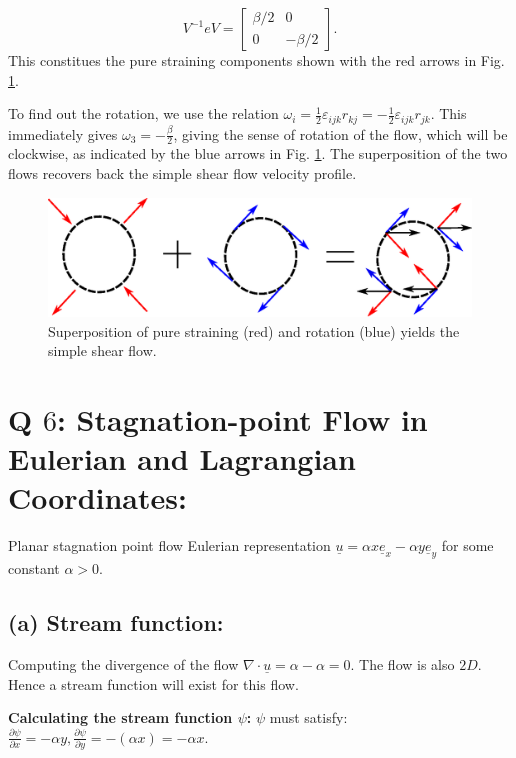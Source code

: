 \documentclass{article}
\begin{document}
\begin{equation}
 V^{-1}e V = \begin{bmatrix}
              \beta/2 & 0\\
              0 & -\beta/2
             \end{bmatrix}.
\end{equation}
This constitues the pure straining components shown with the red arrows in Fig. \ref{fig:shearflow_decomp}. 

To find out the rotation, we use the relation $\omega_{i} = \frac{1}{2}\varepsilon_{ijk} r_{kj} = - \frac{1}{2} \varepsilon_{ijk} r_{jk}$.
This immediately gives $\omega_{3} = -\frac{\beta}{2}$, giving the sense of rotation of the flow, which will be clockwise, as indicated by the blue arrows in Fig. \ref{fig:shearflow_decomp}. The superposition of the two flows recovers back the simple shear flow velocity profile. 
\begin{figure}[H]
    \centering
    \includegraphics[scale = 0.8]{Figs/shearflow_decomp.eps}
    \caption{Superposition of pure straining (red) and rotation (blue) yields the simple shear flow.}
    \label{fig:shearflow_decomp}
\end{figure}
\section{Q $6$: Stagnation-point Flow in Eulerian and Lagrangian Coordinates:}
Planar stagnation point flow Eulerian representation $\underline{u} = \alpha x \underline{e}_{x} - \alpha y \underline{e}_{y}$ for some constant $\alpha > 0$.
\subsection*{(a) Stream function:} 
Computing the divergence of the flow $\nabla\cdot \underline{u} = \alpha - \alpha = 0$. The flow is also $2D$. Hence a stream function will exist for this flow. 

\textbf{Calculating the stream function $\psi$:}
$\psi$ must satisfy: $\frac{\partial \psi}{\partial x} = - \alpha y, \frac{\partial \psi}{\partial y} = -(\alpha x) = - \alpha x$. 
\end{document}
